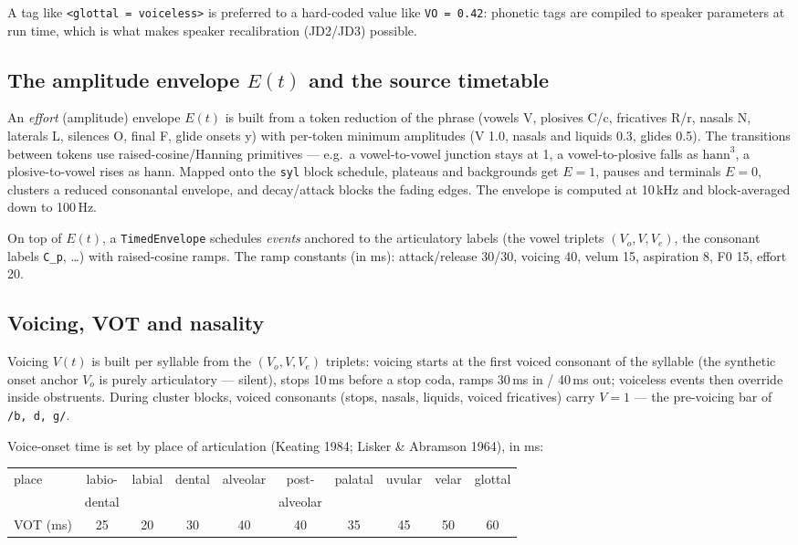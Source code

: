 \documentclass[11pt,a4paper]{article}
\begin{document}
A tag like \texttt{<glottal = voiceless>} is preferred to a hard-coded
value like \texttt{VO = 0.42}: phonetic tags are compiled to speaker
parameters at run time, which is what makes speaker recalibration
(JD2/JD3) possible.

\subsection{The amplitude envelope \(E(t)\) and the source timetable}

An \emph{effort} (amplitude) envelope \(E(t)\) is built from a token
reduction of the phrase (vowels V, plosives C/c, fricatives R/r, nasals
N, laterals L, silences O, final F, glide onsets y) with per-token
minimum amplitudes (V 1.0, nasals and liquids 0.3, glides 0.5). The
transitions between tokens use raised-cosine/Hanning primitives ---
e.g.\ a vowel-to-vowel junction stays at 1, a vowel-to-plosive falls as
\(\mathrm{hann}^{3}\), a plosive-to-vowel rises as \(\mathrm{hann}\).
Mapped onto the \texttt{syl} block schedule, plateaus and backgrounds get
\(E = 1\), pauses and terminals \(E = 0\), clusters a reduced
consonantal envelope, and decay/attack blocks the fading edges. The
envelope is computed at 10\,kHz and block-averaged down to 100\,Hz.

On top of \(E(t)\), a \texttt{TimedEnvelope} schedules \emph{events}
anchored to the articulatory labels (the vowel triplets
\((V_o, V, V_e)\), the consonant labels \texttt{C\_p}, \ldots) with
raised-cosine ramps. The ramp constants (in ms): attack/release 30/30,
voicing 40, velum 15, aspiration 8, F0 15, effort 20.

\subsection{Voicing, VOT and nasality}

Voicing \(V(t)\) is built per syllable from the \((V_o, V, V_e)\)
triplets: voicing starts at the first voiced consonant of the syllable
(the synthetic onset anchor \(V_o\) is purely articulatory --- silent),
stops 10\,ms before a stop coda, ramps 30\,ms in / 40\,ms out; voiceless
events then override inside obstruents. During cluster blocks, voiced
consonants (stops, nasals, liquids, voiced fricatives) carry
\(V = 1\) --- the pre-voicing bar of \texttt{/b, d, g/}.

Voice-onset time is set by place of articulation (Keating 1984; Lisker \&
Abramson 1964), in ms:

\begin{center}
\footnotesize
\begin{tabular}{@{}lccccccccc@{}}
\toprule
place & labio- & labial & dental & alveolar & post- & palatal & uvular & velar & glottal \\
 & dental & & & & alveolar & & & & \\
\midrule
VOT (ms) & 25 & 20 & 30 & 40 & 40 & 35 & 45 & 50 & 60 \\
\bottomrule
\end{tabular}
\end{center}
\end{document}
